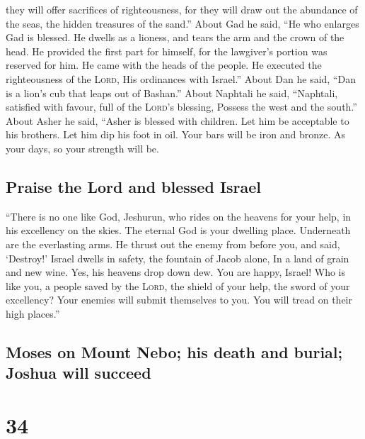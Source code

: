they will offer sacrifices of righteousness, for they will draw out the
abundance of the seas, the hidden treasures of the sand.''
 About Gad he said, ``He who enlarges Gad is blessed. He
dwells as a lioness, and tears the arm and the crown of the head.
 He provided the first part for himself, for the
lawgiver's portion was reserved for him. He came with the heads of the
people. He executed the righteousness of the \textsc{Lord}, His
ordinances with Israel.''  About Dan he said, ``Dan is a
lion's cub that leaps out of Bashan.''  About Naphtali he
said, ``Naphtali, satisfied with favour, full of the \textsc{Lord}'s
blessing, Possess the west and the south.''  About Asher
he said, ``Asher is blessed with children. Let him be acceptable to his
brothers. Let him dip his foot in oil.  Your bars will be
iron and bronze. As your days, so your strength will be.

\hypertarget{praise-the-lord-and-blessed-israel}{%
\subsection{Praise the Lord and blessed
Israel}\label{praise-the-lord-and-blessed-israel}}

 ``There is no one like God, Jeshurun, who rides on the
heavens for your help, in his excellency on the skies. 
The eternal God is your dwelling place. Underneath are the everlasting
arms. He thrust out the enemy from before you, and said, `Destroy!'
 Israel dwells in safety, the fountain of Jacob alone, In
a land of grain and new wine. Yes, his heavens drop down dew.
 You are happy, Israel! Who is like you, a people saved
by the \textsc{Lord}, the shield of your help, the sword of your
excellency? Your enemies will submit themselves to you. You will tread
on their high places.''

\hypertarget{moses-on-mount-nebo-his-death-and-burial-joshua-will-succeed}{%
\subsection{Moses on Mount Nebo; his death and burial; Joshua will
succeed}\label{moses-on-mount-nebo-his-death-and-burial-joshua-will-succeed}}

\hypertarget{section-33}{%
\section{34}\label{section-33}}

